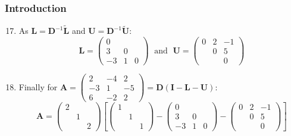 \documentclass[10pt,compress]{beamer}
\begin{document}
\begin{frame}
  \frametitle{Introduction} 
  \begin{enumerate}
  \setcounter{enumi}{16}
     \item <1-> As $\bm{L}=\bm{D}^{-1}\tilde{\bm{L}}$ and $\bm{U}=\bm{D}^{-1}\tilde{\bm{U}}$:
         \begin{displaymath}
             \bm{L}=\begin{pmatrix}0 & & \\ 3 & 0 & \\ -3 & 1 & 0 \end{pmatrix}\;\text{ and }\; \bm{U}=\begin{pmatrix}0 & 2 & -1 \\ & 0 & 5 \\ & & 0 \end{pmatrix}
         \end{displaymath}           
     \item <2-> Finally for $\bm{A}=\begin{pmatrix} 2 & -4 & 2 \\ -3 & 1 & -5 \\ 6 & -2 & 2\end{pmatrix}=\bm{D}\left(\bm{I} - \bm{L} -\bm{U} \right)$:
         \begin{displaymath}
             \bm{A}=\begin{pmatrix}2 &  & \\ & 1 & \\ & & 2\end{pmatrix}\left[ \begin{pmatrix}1 & &\\ & 1 & \\ & & 1\end{pmatrix} - \begin{pmatrix}0 & & \\ 3 & 0 & \\ -3 & 1 & 0 \end{pmatrix} - \begin{pmatrix}0 & 2 & -1 \\ & 0 & 5 \\ & & 0 \end{pmatrix}\right]
         \end{displaymath}
  \end{enumerate}
\end{frame}
\end{document}
